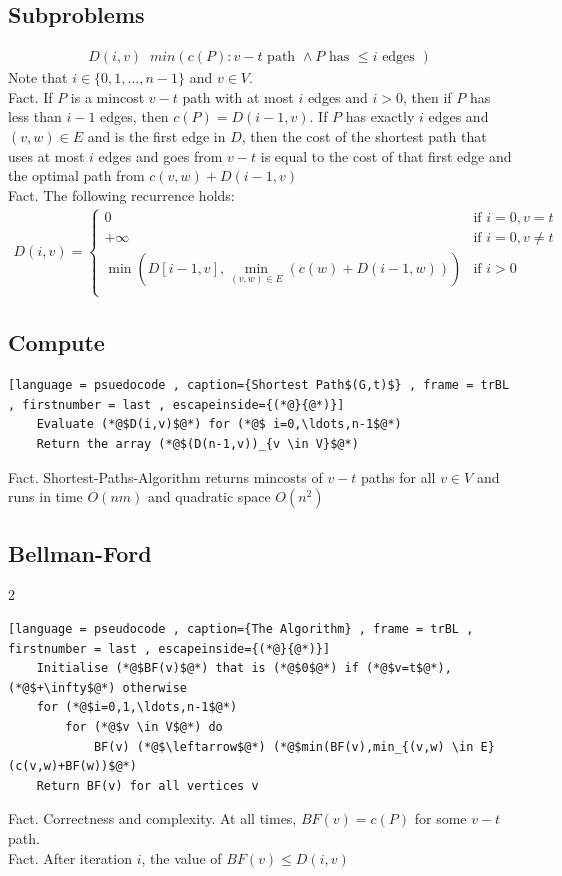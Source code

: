 \documentclass[a4paper]{article}
\theoremstyle{plain}
\newcommand*{\MyDef}{\mathrm{def}}
\newcommand*{\eqdef}{\ensuremath{\mathop{\overset{\MyDef}{=}}}}
\theoremstyle{definition}
\theoremstyle{remark}
\begin{document}
	\subsection{Subproblems}
	\begin{align*}
		D(i,v) \eqdef min\left( c(P) : v-t \text{ path } \land P \text{ has } \le i \text{ edges } \right) 
	\end{align*}	
	Note that $i \in \{0,1,\ldots,n-1\}$ and $v \in V$. \\
	Fact. If $P$ is a mincost $v-t$ path with at most $i$ edges and $i>0$, then if $P$ has less than $i-1$ edges, then $c(P) = D(i-1,v)$. If $P$ has exactly $i$ edges and $(v,w) \in E$ and is the first edge in $D$, then the cost of the shortest path that uses at most $i$ edges and goes from $v-t$ is equal to the cost of that first edge and the optimal path from $c(v,w)+D(i-1,v)$ \\
	Fact. The following recurrence holds:
	\begin{align*}
		D(i,v) = \begin{cases}
		0	& \text{if }i=0, v=t \\
		+\infty	&\text{if }i=0, v\neq t\\
		\min(D[i-1,v], \min_{(v,w) \in E}(c(w) + D(i-1,w)))	&\text{if }i>0 \\
		\end{cases}
	\end{align*}
	\subsection{Compute}
	\begin{lstlisting}[language = psuedocode , caption={Shortest Path$(G,t)$} , frame = trBL , firstnumber = last , escapeinside={(*@}{@*)}]
	Evaluate (*@$D(i,v)$@*) for (*@$ i=0,\ldots,n-1$@*)
	Return the array (*@$(D(n-1,v))_{v \in V}$@*)
	\end{lstlisting}
	Fact. Shortest-Paths-Algorithm returns mincosts of $v-t$ paths for all $v \in V$ and runs in time $O(nm)$ and quadratic space  $O(n^2)$
	\subsection{Bellman-Ford}2
	\begin{lstlisting}[language = pseudocode , caption={The Algorithm} , frame = trBL , firstnumber = last , escapeinside={(*@}{@*)}]
	Initialise (*@$BF(v)$@*) that is (*@$0$@*) if (*@$v=t$@*), (*@$+\infty$@*) otherwise
	for (*@$i=0,1,\ldots,n-1$@*)
		for (*@$v \in V$@*) do
			BF(v) (*@$\leftarrow$@*) (*@$min(BF(v),min_{(v,w) \in E}(c(v,w)+BF(w))$@*)
	Return BF(v) for all vertices v
	\end{lstlisting}
	Fact. Correctness and complexity. At all times, $BF(v)= c(P)$ for some $v-t$ path.\\
	Fact. After iteration $i$, the value of $BF(v) \le D(i,v)$
\end{document}
